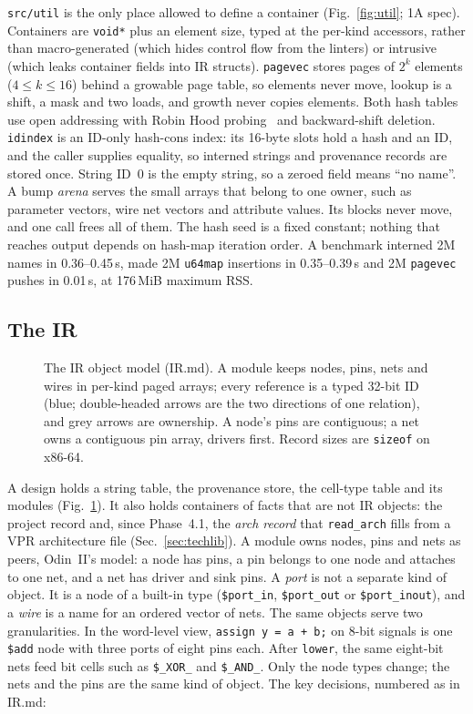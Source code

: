 \documentclass[conference]{IEEEtran}
\newcommand{\code}[1]{\texttt{#1}}
\begin{document}
\code{src/util} is the only place allowed to define a container (Fig.~\ref{fig:util}; 1A
spec). Containers are \code{void*} plus an element size, typed at the per-kind accessors,
rather than macro-generated (which hides control flow from the linters) or intrusive (which leaks
container fields into IR structs). \code{pagevec} stores pages of $2^k$ elements
($4 \le k \le 16$) behind a growable page table, so elements never move, lookup is a shift, a
mask and two loads, and growth never copies elements. Both hash tables use open addressing with
Robin Hood probing~ and backward-shift deletion. \code{idindex} is an
ID-only hash-cons index: its 16-byte slots hold a hash and an ID, and the caller supplies
equality, so interned strings and provenance records are stored once. String ID~0 is the empty
string, so a zeroed field means ``no name''. A bump \emph{arena} serves the small arrays that belong to one owner, such as parameter vectors,
wire net vectors and attribute values. Its blocks never move, and one call frees all of them.
The hash seed is a fixed constant; nothing that
reaches output depends on hash-map iteration order. A benchmark interned 2M names in
0.36--0.45\,s, made 2M \code{u64map} insertions in 0.35--0.39\,s and 2M \code{pagevec} pushes in
0.01\,s, at 176\,MiB maximum RSS.

\subsection{The IR}
\label{sec:ids}

\begin{figure}[t]
\centering
\odinfit{\textwidth}{}
\caption{The IR object model (IR.md). A module keeps nodes, pins, nets and wires in
per-kind paged arrays; every reference is a typed 32-bit ID (blue; double-headed arrows are the
two directions of one relation), and grey arrows are ownership. A node's pins are contiguous; a
net owns a contiguous pin array, drivers first. Record sizes are \code{sizeof} on x86-64.}
\label{fig:ir}
\end{figure}

A design holds a string table, the provenance store, the cell-type table and its modules
(Fig.~\ref{fig:ir}). It also holds containers of facts that are not IR objects: the project
record and, since Phase~4.1, the \emph{arch record} that \code{read\_arch} fills from a VPR
architecture file (Sec.~\ref{sec:techlib}). A module owns nodes, pins and nets as peers, Odin~II's model: a node has
pins, a pin belongs to one node and attaches to one net, and a net has driver and sink pins.
A \emph{port} is not a separate kind of object. It is a node of a built-in type
(\code{\$port\_in}, \code{\$port\_out} or \code{\$port\_inout}), and a \emph{wire} is a name for an ordered
vector of nets. The same objects serve two granularities. In the word-level view, \code{assign y
= a + b;} on 8-bit signals is one \code{\$add} node with three ports of eight pins each. After
\code{lower}, the same eight-bit nets feed bit cells such as \code{\$\_XOR\_} and
\code{\$\_AND\_}. Only the node types change; the nets and the pins are the same kind of object.
The key decisions, numbered as in IR.md:
\end{document}
